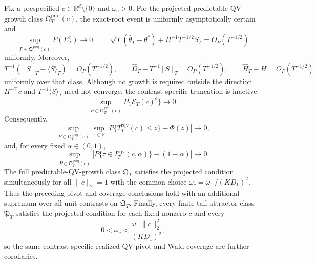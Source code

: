 Fix a prespecified \(c\in\mathbb R^d\setminus\{0\}\) and \(\omega_c>0\). For the projected predictable-QV-growth class \(\mathfrak Q_T^{\mathrm{proj}}(c)\), the exact-root event is uniformly asymptotically certain and
\[
 \sup_{P\in\mathfrak Q_T^{\mathrm{proj}}(c)}P(E_T^c)\longrightarrow0,
 \qquad
 \sqrt T(\widehat\theta_T-\theta^*)+H^{-1}T^{-1/2}S_T
 =O_P(T^{-1/2})
\]
uniformly. Moreover,
\[
 T^{-1}([S]_T-\langle S\rangle_T)=O_P(T^{-1/2}),\qquad
 \widehat\Omega_T-T^{-1}[S]_T=O_P(T^{-1/2}),\qquad
 \widehat H_T-H=O_P(T^{-1/2})
\]
uniformly over that class. Although no growth is required outside the direction \(H^{-\top}c\) and \(T^{-1}\langle S\rangle_T\) need not converge, the contrast-specific truncation is inactive:
\[
 \sup_{P\in\mathfrak Q_T^{\mathrm{proj}}(c)}P\{\mathcal E_T(c)^c\}
 \longrightarrow0.
\]
Consequently,
\[
 \sup_{P\in\mathfrak Q_T^{\mathrm{proj}}(c)}\sup_{z\in\mathbb R}
 \left|P\{T_T^{\mathrm{rqv}}(c)\le z\}-\Phi(z)\right|
 \longrightarrow0,
\]
and, for every fixed \(\alpha\in(0,1)\),
\[
 \sup_{P\in\mathfrak Q_T^{\mathrm{proj}}(c)}
 \left|P\{\tau\in I_T^{\mathrm{rqv}}(c,\alpha)\}-(1-\alpha)\right|
 \longrightarrow0.
\]
The full predictable-QV-growth class \(\mathfrak Q_T\) satisfies the projected condition simultaneously for all \(\|c\|_2=1\) with the common choice \(\omega_c=\omega_-/(KD_1)^2\). Thus the preceding pivot and coverage conclusions hold with an additional supremum over all unit contrasts on \(\mathfrak Q_T\). Finally, every finite-tail-attractor class \(\mathfrak P_T\) satisfies the projected condition for each fixed nonzero \(c\) and every
\[
 0<\omega_c<\frac{\omega_-\|c\|_2^2}{(KD_1)^2},
\]
so the same contrast-specific realized-QV pivot and Wald coverage are further corollaries.